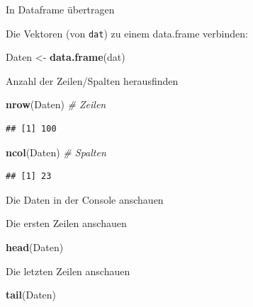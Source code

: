 \documentclass[ignorenonframetext,]{beamer}
\newenvironment{Shaded}{}{}
\newcommand{\KeywordTok}[1]{\textcolor[rgb]{0.00,0.44,0.13}{\textbf{{#1}}}}
\newcommand{\StringTok}[1]{\textcolor[rgb]{0.25,0.44,0.63}{{#1}}}
\newcommand{\CommentTok}[1]{\textcolor[rgb]{0.38,0.63,0.69}{\textit{{#1}}}}
\newcommand{\NormalTok}[1]{{#1}}
\begin{document}
\begin{frame}[fragile]{In Dataframe übertragen}

Die Vektoren (von \texttt{dat}) zu einem data.frame verbinden:

\begin{Shaded}
\begin{Highlighting}[]
\NormalTok{Daten <-}\StringTok{ }\KeywordTok{data.frame}\NormalTok{(dat)}
\end{Highlighting}
\end{Shaded}

Anzahl der Zeilen/Spalten herausfinden

\begin{Shaded}
\begin{Highlighting}[]
\KeywordTok{nrow}\NormalTok{(Daten) }\CommentTok{# Zeilen}
\end{Highlighting}
\end{Shaded}

\begin{verbatim}
## [1] 100
\end{verbatim}

\begin{Shaded}
\begin{Highlighting}[]
\KeywordTok{ncol}\NormalTok{(Daten) }\CommentTok{# Spalten}
\end{Highlighting}
\end{Shaded}

\begin{verbatim}
## [1] 23
\end{verbatim}

\end{frame}

\begin{frame}[fragile]{Die Daten in der Console anschauen}

\begin{block}{Die ersten Zeilen anschauen}

\begin{Shaded}
\begin{Highlighting}[]
\KeywordTok{head}\NormalTok{(Daten)}
\end{Highlighting}
\end{Shaded}

\end{block}

\begin{block}{Die letzten Zeilen anschauen}

\begin{Shaded}
\begin{Highlighting}[]
\KeywordTok{tail}\NormalTok{(Daten)}
\end{Highlighting}
\end{Shaded}

\end{block}

\end{frame}
\end{document}
